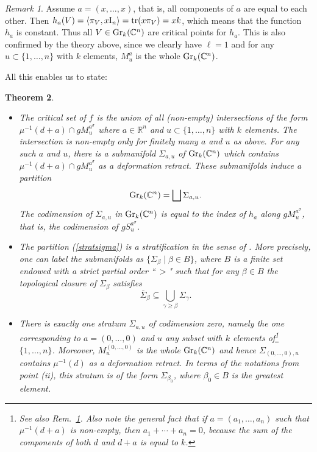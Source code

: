 \documentclass[12pt]{amsart}
\newtheorem{thm}{Theorem}[section]
\theoremstyle{definition}
\theoremstyle{remark}
\newtheorem{rem}[thm]{Remark}
\newcommand{\RR}{\mathbb R}
\newcommand{\CC}{\mathbb C}
\begin{document}
\begin{rem} \label{unif} Assume $a=(x, \ldots, x)$, that is, all components of $a$ are equal to each other. Then 
$h_a(V) = \langle \pi_V, x{\rm I}_n\rangle = {\rm tr}(x\pi_V)=xk$, which means that the function $h_a$ is constant. 
Thus all $V\in {\rm Gr}_k(\CC^n)$ are critical points for $h_a$. This is also confirmed by the theory above, since 
we clearly have $\ell =1$ and for any $u\subset \{1, \ldots, n\}$ with $k$ elements, $M_u^a$ is the whole 
${\rm Gr}_k(\CC^n)$. 
\end{rem}

 All this  enables us to state:
  
\begin{thm}\label{stratif} \begin{itemize} 
\item[(i)] The critical set of $f_{}$ is the union of all (non-empty) intersections of the form
$\mu^{-1}(d+a) \cap gM_{u}^{{a}^\sigma}$ where $a\in \RR^n$  and $u\subset \{1, \ldots, n\}$ with $k$ elements.
The intersection is non-empty  only for finitely many  $a$ and $u$ as above. For any such $a$ and $u$, there is a submanifold
$\Sigma_{a, u}$  of ${\rm Gr}_k(\CC^n)$ which contains $\mu^{-1}(d+a) \cap gM_{u}^{{a}^\sigma}$
as a deformation retract. These submanifolds induce a partition 
\begin{equation}\label{stratsigma}{\rm Gr}_k(\CC^n)= \bigsqcup \Sigma_{a, u}.\end{equation}
The codimension of $\Sigma_{a,u}$ in
${\rm Gr}_k(\CC^n)$ is equal to the index of $h_a$ along $gM_{u}^{{a}^\sigma}$, that is, the codimension of
$gS_{u}^{a^\sigma}$.
\item[(ii)] The partition (\ref{stratsigma}) is a stratification in the sense of \cite[Def.~2.11]{Ki}. More precisely, one can label the submanifolds as $\{\Sigma_\beta  \mid \beta\in B\}$, where $B$ is a finite set endowed with a strict partial order ``$ \ >$" such that for any $\beta \in B$ the topological closure of $\Sigma_\beta$ satisfies
\begin{equation}\label{osig} \overline{\Sigma}_\beta \subseteq \bigcup_{\gamma \ge \beta} \Sigma_\gamma.\end{equation} 
\item[(iii)] There is exactly one stratum $\Sigma_{a,u}$ of codimension zero, namely 
the one corresponding to $a=(0, \ldots, 0)$ 
and $u$  any subset with $k$ elements of\footnote{See also Rem.~\ref{unif}. Also note the general fact that if $a=(a_1, \ldots, a_n)$ such that $\mu^{-1}(d+a)$ is non-empty, then $a_1+\cdots + a_n=0$, because the sum of the components of both $d$ and $d+a$ is equal to $k$.}
$\{1, \ldots, n\}$.  Moreover,  $M_{u}^{(0, \ldots, 0)}$ is the whole ${\rm Gr}_k(\CC^n)$ and hence 
$\Sigma_{(0, \ldots, 0),u}$ contains $\mu^{-1}(d)$ as a deformation retract. In terms of the notations from point (ii), this stratum is of the form $\Sigma_{\beta_0}$, where $\beta_0\in B$ is the greatest element.
\end{itemize} 
\end{thm} 
\end{document}
